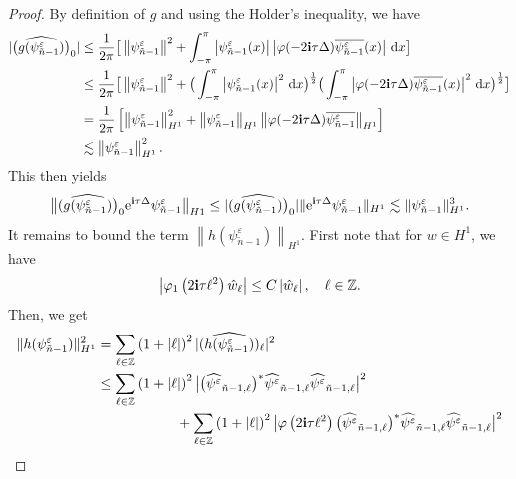 \documentclass[a4paper]{amsart}
\begin{document}
\begin{proof}
By definition of $g$ and using the Holder's inequality, we have
\begin{align*}
|\big(\widehat{g(\psi^\varepsilon_{\tilde{n}-1})}\big)_0|&\le \displaystyle\frac{1}{2\pi}\big[\left\|\psi_{\tilde{n}-1}^\varepsilon\right\|^2+\int_{-\pi}^{\pi}\left|\psi^\varepsilon_{\tilde{n}-1}(x)\right|\left|\varphi(-2{\bf i}\tau \Delta)\overline{\psi_{\tilde{n}-1}^\varepsilon}(x)\right| \,{\rm d}x\big]\\
&\le \displaystyle\frac{1}{2\pi}\big[\left\|\psi_{\tilde{n}-1}^\varepsilon\right\|^2+\big(\int_{-\pi}^{\pi}\left| \psi_{\tilde{n}-1}^\varepsilon(x)\right|^2\,{\rm d}x\big)^{\frac{1}{2}}
\big(\int_{-\pi}^{\pi}\left|\varphi(-2{\bf i}\tau \Delta)\overline{\psi_{\tilde{n}-1}^\varepsilon}(x)\right|^2\,{\rm d}x\big)^{\frac{1}{2}}\big]\\
&=\displaystyle\frac{1}{2\pi}\left[\left\|\psi^\varepsilon_{\tilde{n}-1}\right\|^2_{H^1}+\left\|\psi^\varepsilon_{\tilde{n}-1}\right\|_{H^1}\left\|\varphi(-2{\bf i}\tau \Delta) \overline{\psi_{\tilde{n}-1}^\varepsilon}\right\|_{H^1}\right]\\
&\lesssim  \left\| \psi_{\tilde{n}-1}^\varepsilon\right\|_{H^1}^2.
\end{align*}
This then yields
$$
\big\| (\widehat{g(\psi_{\tilde{n}-1}^\varepsilon)}\big)_0 {\rm e}^{{\bf i} \tau \Delta} \psi_{\tilde{n}-1}^\varepsilon\big\|_{H1}\le |  (\widehat{g(\psi_{\tilde{n}-1}^\varepsilon)}\big)_0|
\| {\rm e}^{{\bf i} \tau \Delta} \psi^\varepsilon_{\tilde{n}-1}\|_{H^1}\lesssim  \|\psi^\varepsilon_{\tilde{n}-1} \|^3_{H^1}.
$$
It remains to bound the term $\left\| h(\psi^\varepsilon_{\tilde{n}-1})\right\|_{H^1}$. First note that for $w \in H^1$, we have
$$
\left| \varphi_1\left(2 {\bf i} \tau \ell^2\right) \hat{w}_\ell \right|\le C \left|\hat{w}_\ell \right|, \quad \ell \in \mathbb{Z}.
$$
Then, we get
\begin{align*}
\| h(\psi^\varepsilon_{\tilde{n}-1})\|_{H^1}^2 &= \displaystyle\sum_{\ell \in\mathbb{Z}}\left(1+\left|\ell\right|\right)^{2}| (\widehat{h(\psi^\varepsilon_{\tilde{n}-1})})_\ell |^2\\
&\le  \displaystyle\sum_{\ell \in\mathbb{Z}}\left(1+\left|\ell \right|\right)^{2} \big|\big( \widehat{\psi^\varepsilon}_{\tilde{n}-1,\ell} \big)^*\widehat{\psi^\varepsilon}_{\tilde{n}-1,\ell}\widehat{\psi^\varepsilon}_{\tilde{n}-1,\ell} \big|^2\\
&\hspace{2cm}+\displaystyle\sum_{\ell \in\mathbb{Z}}\left(1+\left|\ell \right|\right)^{2} \big| \varphi\left(2 {\bf i} \tau \ell ^2\right)  \big( \widehat{\psi^\varepsilon}_{\tilde{n}-1,\ell} \big)^*\widehat{\psi^\varepsilon}_{\tilde{n}-1,\ell}\widehat{\psi^\varepsilon}_{\tilde{n}-1,\ell}\big|^2\\

\end{align*}
\end{proof}
\end{document}

